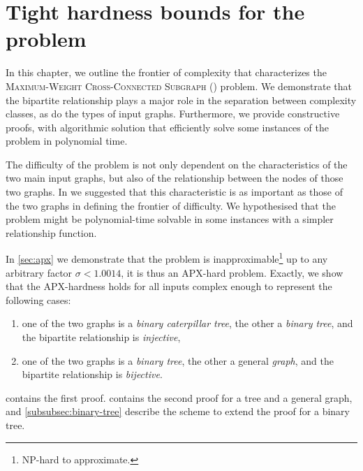 \chapter{Tight hardness bounds for the \mwccs{} problem}
\label{chap:hard}

	In this chapter, we outline the frontier of complexity that characterizes the \textsc{Maximum-Weight Cross-Connected Subgraph} (\mwccs{}) problem.
	We demonstrate that the bipartite relationship plays a major role in the separation between complexity classes, as do the types of input graphs.
	Furthermore, we provide constructive proofs, with algorithmic solution that efficiently solve some instances of the problem in polynomial time.

	The difficulty of the problem is not only dependent on the characteristics of the two main input graphs, but also of the relationship between the nodes of those two graphs.
	In \cite{hume2015approximation} we suggested that this characteristic is as important as those of the two graphs in defining the frontier of difficulty.
	We hypothesised that the problem might be polynomial-time solvable in some instances with a simpler relationship function.

	In \cref{sec:apx} we demonstrate that the \mwccs{} problem is inapproximable\footnote{NP-hard to approximate.} up to any arbitrary factor $\sigma < 1.0014$, it is thus an APX-hard problem.
	Exactly, we show that the APX-hardness holds for all inputs complex enough to represent the following cases:
	\begin{enumerate}
		\item one of the two graphs is a \emph{binary caterpillar tree}, the other a \emph{binary tree}, and the bipartite relationship is \emph{injective},
		\item one of the two graphs is a \emph{binary tree}, the other a general \emph{graph}, and the bipartite relationship is \emph{bijective}.
	\end{enumerate}
	 contains the first proof.
	 contains the second proof for a tree and a general graph, and \cref{subsubsec:binary-tree} describe the scheme to extend the proof for a binary tree.

